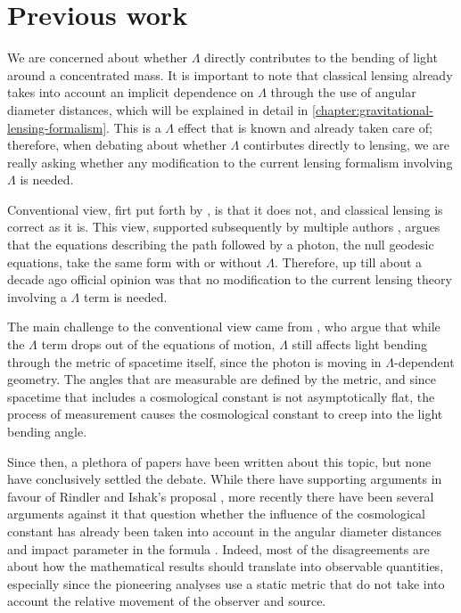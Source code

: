 \section{Previous work}

We are concerned about whether $\Lambda$ directly contributes to the bending of light around a concentrated mass. It is important to note that classical lensing already takes into account an implicit dependence on $\Lambda$ through the use of angular diameter distances, which will be explained in detail in \autoref{chapter:gravitational-lensing-formalism}. This is a $\Lambda$ effect that is known and already taken care of; therefore, when debating about whether $\Lambda$ contirbutes directly to lensing, we are really asking whether any modification to the current lensing formalism involving $\Lambda$ is needed. 

Conventional view, firt put forth by \citet{islam1983cosmological}, is that it does not, and classical lensing is correct as it is. This view, supported subsequently by multiple authors \citep{lake2002bending,park2008rigorous,simpson2010lensing,khriplovich2008does}, argues that the equations describing the path followed by a photon, the null geodesic equations, take the same form with or without $\Lambda$. Therefore, up till about a decade ago official opinion was that no modification to the current lensing theory involving a $\Lambda$ term is needed. 

The main challenge to the conventional view came from \citet{rindler2007contribution}, who argue that while the $\Lambda$ term drops out of the equations of motion, $\Lambda$ still affects light bending through the metric of spacetime itself, since the photon is moving in $\Lambda$-dependent geometry. The angles that are measurable are defined by the metric, and since spacetime that includes a cosmological constant is not asymptotically flat, the process of measurement causes the cosmological constant to creep into the light bending angle. 

Since then, a plethora of papers have been written about this topic, but none have conclusively settled the debate. While there have supporting arguments in favour of Rindler and Ishak's proposal \citep{sereno2008influence,bhadra2010gravitational,schucker2008strong}, more recently there have been several arguments against it that question whether the influence of the cosmological constant has already been taken into account in the angular diameter distances and impact parameter in the formula \citep{butcher2016no,piattella2016lensing,arakida2012effect}. Indeed, most of the disagreements are about how the mathematical results should translate into observable quantities, especially since the pioneering analyses use a static metric that do not take into account the relative movement of the observer and source.  

